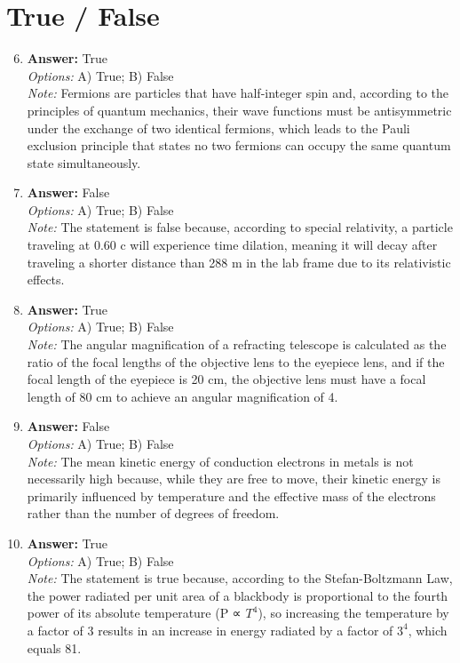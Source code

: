 \documentclass[12pt]{article}
\begin{document}
\section*{True / False}
\begin{enumerate}[label=\arabic*.]
\setcounter{enumi}{5}
\item \textbf{Answer:} True
\\ \textit{Options:} A) True; B) False
\\ \textit{Note:} Fermions are particles that have half-integer spin and, according to the principles of quantum mechanics, their wave functions must be antisymmetric under the exchange of two identical fermions, which leads to the Pauli exclusion principle that states no two fermions can occupy the same quantum state simultaneously.
\item \textbf{Answer:} False
\\ \textit{Options:} A) True; B) False
\\ \textit{Note:} The statement is false because, according to special relativity, a particle traveling at 0.60 c will experience time dilation, meaning it will decay after traveling a shorter distance than 288 m in the lab frame due to its relativistic effects.
\item \textbf{Answer:} True
\\ \textit{Options:} A) True; B) False
\\ \textit{Note:} The angular magnification of a refracting telescope is calculated as the ratio of the focal lengths of the objective lens to the eyepiece lens, and if the focal length of the eyepiece is 20 cm, the objective lens must have a focal length of 80 cm to achieve an angular magnification of 4.
\item \textbf{Answer:} False
\\ \textit{Options:} A) True; B) False
\\ \textit{Note:} The mean kinetic energy of conduction electrons in metals is not necessarily high because, while they are free to move, their kinetic energy is primarily influenced by temperature and the effective mass of the electrons rather than the number of degrees of freedom.
\item \textbf{Answer:} True
\\ \textit{Options:} A) True; B) False
\\ \textit{Note:} The statement is true because, according to the Stefan-Boltzmann Law, the power radiated per unit area of a blackbody is proportional to the fourth power of its absolute temperature (P ∝ $T^4$), so increasing the temperature by a factor of 3 results in an increase in energy radiated by a factor of $3^4$, which equals 81.
\end{enumerate}
\end{document}
